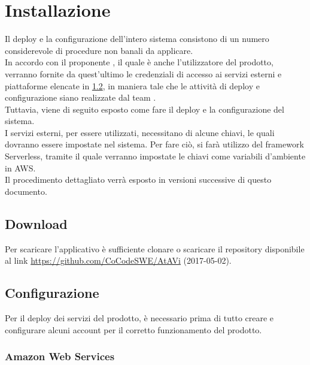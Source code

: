 \section{Installazione}
Il deploy e la configurazione dell'intero sistema consistono di un numero considerevole di procedure non banali da applicare.\\
In accordo con il proponente \PROPONENTE, il quale è anche l'utilizzatore del prodotto, verranno fornite da quest'ultimo le credenziali di accesso ai servizi esterni e piattaforme elencate in \ref{configurazione}, in maniera tale che le attività di deploy e configurazione siano realizzate dal team \GRUPPO.\\
Tuttavia, viene di seguito esposto come fare il deploy e la configurazione del sistema.\\
I servizi esterni, per essere utilizzati, necessitano di alcune chiavi, le quali dovranno essere impostate nel sistema. Per fare ciò, si farà utilizzo del framework Serverless, tramite il quale verranno impostate le chiavi come variabili d'ambiente in AWS.\\
Il procedimento dettagliato verrà esposto in versioni successive di questo documento.
\subsection{Download}\label{download}
Per scaricare l'applicativo è sufficiente clonare o scaricare il repository disponibile al link \url{https://github.com/CoCodeSWE/AtAVi} (2017-05-02).

\subsection{Configurazione}\label{configurazione}
Per il deploy dei servizi del prodotto, è necessario prima di tutto creare e configurare alcuni account per il corretto funzionamento del prodotto.

\subsubsection{Amazon Web Services}
